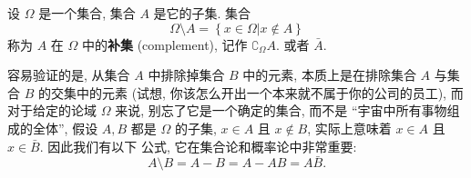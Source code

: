 \documentclass[10pt,UTF8]{book} %
\begin{document}
\begin{definition}[补集]
    设 $\varOmega$ 是一个集合, 集合 $A$ 是它的子集. 集合
    \[ \varOmega \setminus A = \left\{ x \in \varOmega | x \notin A \right\} \]
    称为 $A$ 在 $\Omega$ 中的\textbf{补集} (complement), 记作 $\complement_\varOmega A$.
    或者 $\bar A$.
\end{definition}

容易验证的是, 从集合 $A$ 中排除掉集合 $B$ 中的元素, 本质上是在排除集合 $A$ 与集合 $B$
的交集中的元素 (试想, 你该怎么开出一个本来就不属于你的公司的员工), 
而对于给定的论域 $\Omega$ 来说, 别忘了它是一个确定的集合, 而不是 “宇宙中所有事物组成的全体”, 
假设 $A,B$ 都是 $\varOmega$ 的子集, $x \in A$ 且 $x \notin B$, 实际上意味着
$x \in A$ 且 $x \in \bar B$. 因此我们有以下
公式, 它在集合论和概率论中非常重要:
\[ \boxed{A \setminus B = A - B = A-AB = A\bar B.} \]
\end{document}
